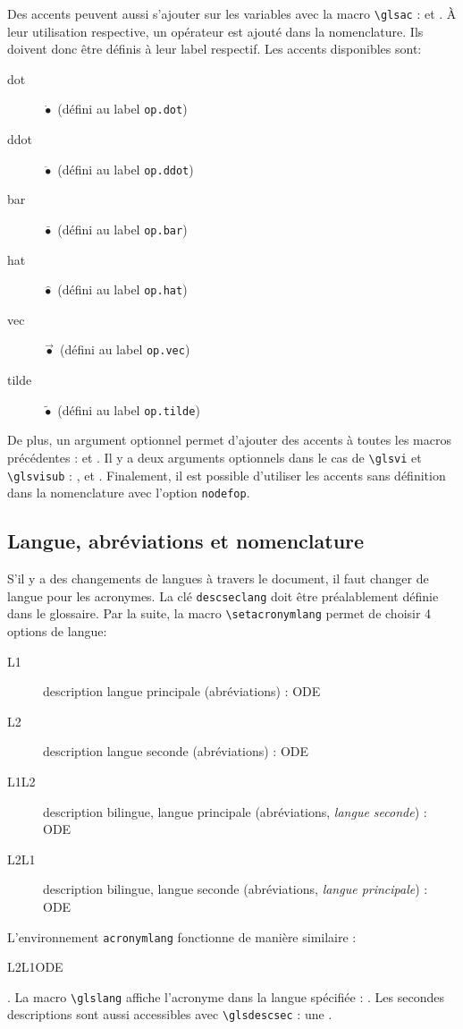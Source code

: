 \documentclass[projet,nohyperref,article,english,french]{ulthese}
\begin{document}
Des accents peuvent aussi s'ajouter sur les variables avec la macro \texttt{\textbackslash glsac} :  et . À leur utilisation respective, un opérateur est ajouté dans la nomenclature. Ils doivent donc être définis à leur label respectif. Les accents disponibles sont:
\begin{description} 
\item[dot] $\dot{\bullet}$ (défini au label \texttt{op.dot})
\item[ddot] $\ddot{\bullet}$ (défini au label \texttt{op.ddot})
\item[bar] $\bar{\bullet}$ (défini au label \texttt{op.bar})
\item[hat] $\widehat{\bullet}$ (défini au label \texttt{op.hat})
\item[vec] $\vec{\bullet}$ (défini au label \texttt{op.vec})
\item[tilde] $\widetilde{\bullet}$ (défini au label \texttt{op.tilde})
\end{description}
De plus, un argument optionnel permet d'ajouter des accents à toutes les macros précédentes :  et . Il y a deux arguments optionnels dans le cas de \texttt{\textbackslash glsvi} et \texttt{\textbackslash glsvisub} : ,  et . Finalement, il est possible d'utiliser les accents sans définition dans la nomenclature avec l'option \texttt{nodefop}.

\subsection{Langue, abréviations et nomenclature}
S'il y a des changements de langues à travers le document, il faut changer de langue pour les acronymes. La clé \texttt{descseclang} doit être préalablement définie dans le glossaire. Par la suite, la macro \texttt{\textbackslash setacronymlang} permet de choisir 4 options de langue: 
\begin{description}
	\item[L1] description langue principale (abréviations) : \acrfull{ODE}
	\item[L2] description langue seconde (abréviations) : \acrfull{ODE}
	\item[L1L2] description bilingue, langue principale (abréviations, \textit{langue seconde}) : \acrfull{ODE}
	\item[L2L1] description bilingue, langue seconde (abréviations, \textit{langue principale}) : \acrfull{ODE}
\end{description}
L'environnement \texttt{acronymlang} fonctionne de manière similaire : \begin{acronymlang}{L2L1}\acrfull{ODE}\end{acronymlang}. La macro \texttt{\textbackslash glslang} affiche l'acronyme dans la langue spécifiée : . Les secondes descriptions sont aussi accessibles avec \texttt{\textbackslash glsdescsec} : une .
\end{document}
